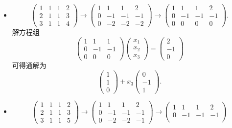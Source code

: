 ﻿\documentclass{book} \usepackage{exsheets} \usepackage{xeCJK}
\begin{document}
\begin{solution}
  \begin{itemize}
  \item
$$
\begin{pmatrix}
  1&1&1&2\\
  2&1&1&3\\
  3&1&1&4
\end{pmatrix}\to
\begin{pmatrix}
  1&1&1&2\\
  0&-1&-1&-1\\
  0&-2&-2&-2
\end{pmatrix}\to
\begin{pmatrix}
  1&1&1&2\\
  0&-1&-1&-1\\
  0&0&0&0
\end{pmatrix}.
$$
解方程组
$$
\begin{pmatrix}
  1&1&1\\
  0&-1&-1\\
  0&0&0
\end{pmatrix}
\begin{pmatrix}
  x_1\\
  x_2\\
  x_3
\end{pmatrix}=
\begin{pmatrix}
  2\\
  -1\\
  0
\end{pmatrix}
$$
可得通解为
$$
\begin{pmatrix}
  1\\
  1\\
  0
\end{pmatrix}+x_3
\begin{pmatrix}
  0\\
  -1\\
  1
\end{pmatrix}.
$$
\item
$$
\begin{pmatrix}
  1&1&1&2\\
  2&1&1&3\\
  3&1&1&5
\end{pmatrix}\to
\begin{pmatrix}
  1&1&1&2\\
  0&-1&-1&-1\\
  0&-2&-2&-1
\end{pmatrix}\to
\begin{pmatrix}
  1&1&1&2\\
  0&-1&-1&-1\\

\end{pmatrix}$$
\end{itemize}
\end{solution}
\end{document}
